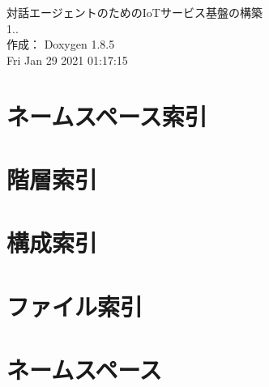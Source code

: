 \documentclass[twoside]{book}
\newcommand{\clearemptydoublepage}{%
  \newpage{\pagestyle{empty}\cleardoublepage}%
}
\begin{document}
\hypersetup{pageanchor=false}
\begin{titlepage}
\vspace*{7cm}
\begin{center}%
{\Large 対話エージェントのための\-Io\-Tサービス基盤の構築 \\[1ex]\large 1.. }\\
\vspace*{1cm}
{\large 作成： Doxygen 1.8.5}\\
\vspace*{0.5cm}
{\small Fri Jan 29 2021 01:17:15}\\
\end{center}
\end{titlepage}
\clearemptydoublepage
\tableofcontents
\clearemptydoublepage
{}
\hypersetup{pageanchor=true}

\chapter{ネームスペース索引}

\chapter{階層索引}

\chapter{構成索引}

\chapter{ファイル索引}

\chapter{ネームスペース}



















\end{document}
